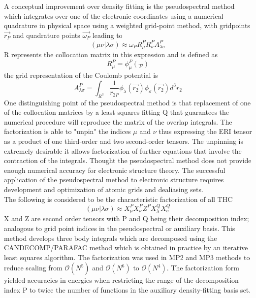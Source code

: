 \documentclass[10pt, draft]{article}
\begin{document}
A conceptual improvement over density fitting is the pseudospectral method which integrates over one of the electronic coordinates using a numerical quadrature in physical space using a weighted grid-point method, with gridpoints $\vec{r_P}$ and quadrature points $\vec{\omega_P}$ leading to $$(\mu\nu|\lambda\sigma) \approx \omega_P R^P_\mu R^P_\nu A^P_{\lambda\sigma} $$ R represents the collocation matrix in this expression and is defined as $$R^P_\mu = \phi^P_\mu(\vec{_P})$$ the grid representation of the Coulomb potential is $$A^P_{\lambda\sigma} = \int_{R^3}\frac{1}{r_{2P}}\phi_\lambda(\vec{r_2})\phi_\sigma(\vec{r_2}) d^3r_2 $$ One distinguishing point of the pseudospectral method is that replacement of one of the collocation matrices by a least squares fitting Q that guarantees the numerical procedure will reproduce the matrix of the overlap integrals.  The factorization is able to "unpin" the indices $\mu$ and $\nu$ thus expressing the ERI tensor as a product of one third-order and two second-order tensors.  The unpinning is extremely desirable it allows factorization of further equations that involve the contraction of the integrals.  Thought the pseudospectral method does not provide enough numerical accuracy for electronic structure theory.  The successful application of the pseudospectral method to electronic structure requires development and optimization of atomic grids and dealiasing sets.  $$$$
The following is considered to be the characteristic factorization of all THC  $$(\mu\nu|\lambda\sigma) \approx X^P_\mu X^P_\nu Z^P X^Q_\lambda X^Q_\sigma$$ X and Z are second order tensors with P and Q being their decomposition index; analogous to grid point indices in the pseudospectral  or auxiliary basis. This method develops three body integrals which are decomposed using the CANDECOMP/PARAFAC method which is obtained in practice by an iterative least squares algorithm.  The factorization was used in MP2 and MP3 methods to reduce scaling from $\mathcal{O}(N^5)$ and $ \mathcal{O}(N^6)$ to $\mathcal{O}(N^4)$.  The factorization form yielded accuracies in energies when restricting the range of the decomposition index P to twice the number of functions in the auxiliary density-fitting basis set.  
\end{document}
